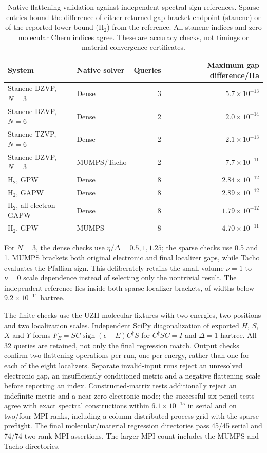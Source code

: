 \documentclass[11pt]{article}
\begin{document}
\begin{table}[htbp]
\centering\small
\begin{tabular}{llrr}
\toprule
System & Native solver & Queries & Maximum gap difference/Ha\\
\midrule
Stanene DZVP, $N=3$ & Dense & 3 & $5.7\times10^{-13}$\\
Stanene DZVP, $N=6$ & Dense & 2 & $2.0\times10^{-14}$\\
Stanene TZVP, $N=6$ & Dense & 2 & $2.1\times10^{-13}$\\
Stanene DZVP, $N=3$ & MUMPS/Tacho & 2 & $7.7\times10^{-11}$\\
H$_2$, GPW & Dense & 8 & $2.84\times10^{-12}$\\
H$_2$, GAPW & Dense & 8 & $2.89\times10^{-12}$\\
H$_2$, all-electron GAPW & Dense & 8 & $1.79\times10^{-12}$\\
H$_2$, GPW & MUMPS & 8 & $4.70\times10^{-11}$\\
\bottomrule
\end{tabular}
\caption{Native flattening validation against independent spectral-sign
references. Sparse entries bound the difference of either returned
gap-bracket endpoint (stanene) or of the reported lower bound (H$_2$)
from the reference. All stanene indices and zero molecular Chern
indices agree. These are accuracy checks, not timings or
material-convergence certificates.}
\label{tab:si-native-flattening}
\end{table}

For $N=3$, the dense checks use $\eta/\Delta=0.5,1,1.25$;
the sparse checks use 0.5 and 1. MUMPS brackets both original
electronic and final localizer gaps, while Tacho evaluates the
Pfaffian sign. This deliberately retains the small-volume
$\nu=1$ to $\nu=0$ scale dependence instead of selecting only
the nontrivial result. The independent reference lies inside
both sparse localizer brackets, of widths below $9.2\times10^{-11}$
hartree.

The finite checks use the UZH molecular fixtures with two energies,
two positions and two localization scales. Independent SciPy
diagonalization of exported $H$, $S$, $X$ and $Y$ forms
$F_E=SC\operatorname{sign}(\epsilon-E)C^\dagger S$ for
$C^\dagger SC=I$ and $\Delta=1$ hartree. All 32 queries
are retained, not only the final regression match.
Output checks confirm two flattening operations per run, one per
energy, rather than one for each of the eight localizers.
Separate invalid-input runs reject an unresolved electronic gap,
an insufficiently conditioned metric and a negative flattening
scale before reporting an index. Constructed-matrix tests additionally
reject an indefinite metric and a near-zero electronic mode; the
successful six-pencil tests agree with exact spectral constructions
within $6.1\times10^{-15}$ in serial and on two/four MPI ranks,
including a column-distributed process grid with the sparse preflight.
The final molecular/material regression directories pass 45/45
serial and 74/74 two-rank MPI assertions. The larger MPI count
includes the MUMPS and Tacho directories.
\end{document}
